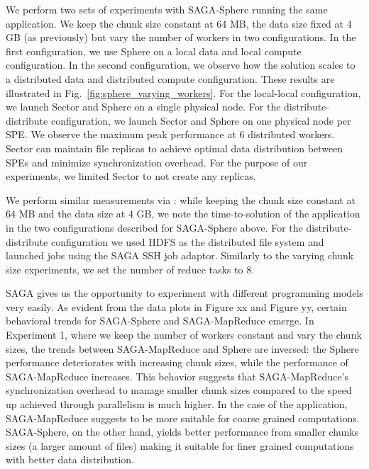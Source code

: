 \documentclass[3p,twocolumn]{elsarticle}
\begin{document}
We perform two sets of experiments with SAGA-Sphere running the same
\wc application.  We keep the chunk size constant at 64 MB, the
data size fixed at 4 GB (as previously) but vary the number of workers
in two configurations. In the first configuration, we use Sphere on a
local data and local compute configuration. In the second
configuration, we observe how the solution scales to a distributed
data and distributed compute configuration. These results are
illustrated in Fig.~\ref{fig:sphere_varying_workers}.  For the local-local
configuration, we launch Sector and Sphere on a single physical node.
For the distribute-distribute configuration, we launch Sector and
Sphere on one physical node per SPE.  We observe the maximum peak
performance at 6 distributed workers. Sector can maintain file
replicas to achieve optimal data distribution between SPEs and
minimize synchronization overhead. For the purpose of our experiments,
we limited Sector to not create any replicas.

We perform similar measurements via \sagamapreduce: while keeping the
chunk size constant at 64 MB and the data size at 4 GB, we note the
time-to-solution of the \wc application in the two
configurations described for SAGA-Sphere above.  For the
distribute-distribute configuration we used HDFS as the distributed
file system and launched jobs using the SAGA SSH job adaptor.
Similarly to the varying chunk size experiments, we set the number of
reduce tasks to 8.  

SAGA gives us the opportunity to experiment with different programming models very easily. 
As evident from the data plots in Figure xx and Figure yy, certain behavioral 
trends for SAGA-Sphere and SAGA-MapReduce emerge.  In Experiment 1, where we keep the 
number of workers constant and vary the chunk sizes, the trends between 
SAGA-MapReduce and Sphere are inversed: the Sphere performance deteriorates with 
increasing chunk sizes, while the performance of SAGA-MapReduce increases. This behavior
suggests that SAGA-MapReduce's synchronization overhead to manage smaller 
chunk sizes compared to the speed up achieved through parallelism is much higher. 
In the case of the \wc application, SAGA-MapReduce suggests to be more 
suitable for coarse grained computations. SAGA-Sphere, on the other hand, yields 
better performance from smaller chunks sizes (a larger amount of files) making it 
suitable for finer grained computations with better data distribution.
\end{document}

